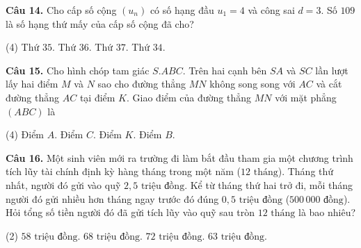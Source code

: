 \documentclass[12pt, a4paper]{article}
\newcommand{\cau}[1]{\vspace{0.12cm}\noindent\textbf{Câu #1. }}
\begin{document}
\cau{14} Cho cấp số cộng $(u_n)$ có số hạng đầu $u_1 = 4$ và công sai $d = 3$. Số $109$ là số hạng thứ mấy của cấp số cộng đã cho?
\begin{tasks}(4)
\task Thứ $35$.
\task Thứ $36$.
\task Thứ $37$.
\task Thứ $34$.
\end{tasks}

\cau{15} Cho hình chóp tam giác $S.ABC$. Trên hai cạnh bên $SA$ và $SC$ lần lượt lấy hai điểm $M$ và $N$ sao cho đường thẳng $MN$ không song song với $AC$ và cắt đường thẳng $AC$ tại điểm $K$. Giao điểm của đường thẳng $MN$ với mặt phẳng $(ABC)$ là
\begin{tasks}(4)
\task Điểm $A$.
\task Điểm $C$.
\task Điểm $K$.
\task Điểm $B$.
\end{tasks}

\noindent
\begin{minipage}[t]{0.70\linewidth}
\cau{16} Một sinh viên mới ra trường đi làm bắt đầu tham gia một chương trình tích lũy tài chính định kỳ hàng tháng trong một năm ($12\text{ tháng}$). Tháng thứ nhất, người đó gửi vào quỹ $2{,}5\text{ triệu đồng}$. Kể từ tháng thứ hai trở đi, mỗi tháng người đó gửi nhiều hơn tháng ngay trước đó đúng $0{,}5\text{ triệu đồng}$ ($500\,000\text{ đồng}$). Hỏi tổng số tiền người đó đã gửi tích lũy vào quỹ sau tròn $12\text{ tháng}$ là bao nhiêu?
\begin{tasks}(2)
\task $58\text{ triệu đồng}$.
\task $68\text{ triệu đồng}$.
\task $72\text{ triệu đồng}$.
\task $63\text{ triệu đồng}$.
\end{tasks}
\end{minipage}\hfill
\end{document}
